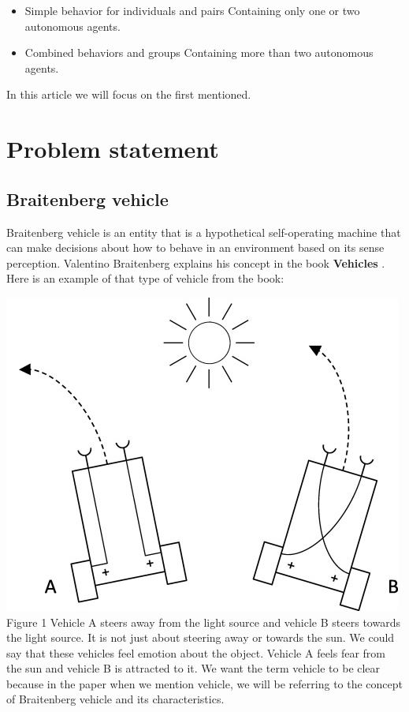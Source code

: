 \documentclass[10pt,twoside,english,a4paper]{article}
\begin{document}
\begin{itemize}
\item Simple behavior for individuals and pairs\newline
Containing only one or two autonomous agents.

\item Combined behaviors and groups\newline
Containing more than two autonomous agents.

\end{itemize}

In this article we will focus on the first mentioned. 

\section{Problem statement} \label{problem}

\subsection{Braitenberg vehicle} \label{braitenberg}

Braitenberg vehicle is an entity that is a hypothetical self-operating machine that can make decisions about how to behave in an environment based on its sense perception. Valentino Braitenberg explains his concept in the book \textbf{Vehicles} \cite{Braitenberg}. Here is an example of that type of vehicle from the book:

\bigbreak

\includegraphics[scale=0.45]{braitenberg.jpg}
\quad Figure 1
\bigbreak
Vehicle A steers away from the light source and vehicle B steers towards the light source. It is not just about steering away or towards the sun. We could say that these vehicles feel emotion about the object. Vehicle A feels fear from the sun and vehicle B is attracted to it. We want the term vehicle to be clear because in the paper when we mention vehicle, we will be referring to the concept of Braitenberg vehicle and its characteristics. 
\end{document}
